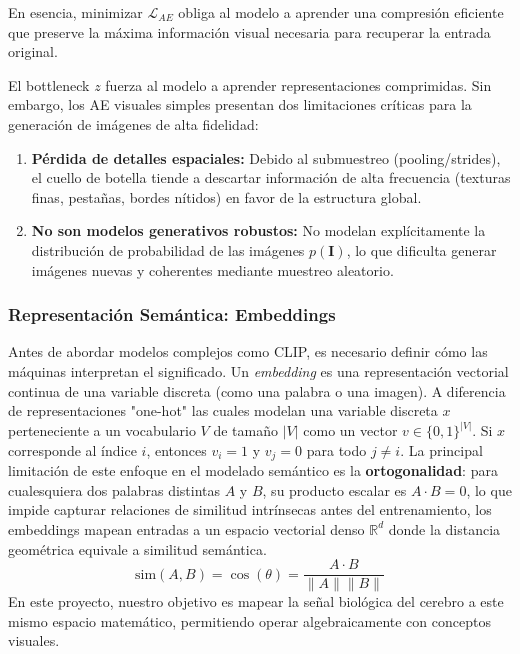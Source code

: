 \documentclass{article}
\begin{document}
En esencia, minimizar $\mathcal{L}_{AE}$ obliga al modelo a aprender una compresión eficiente que preserve la máxima información visual necesaria para recuperar la entrada original.

El bottleneck $z$ fuerza al modelo a aprender representaciones comprimidas. Sin embargo, los AE visuales simples presentan dos limitaciones críticas para la generación de imágenes de alta fidelidad:
\begin{enumerate}
    \item \textbf{Pérdida de detalles espaciales:} Debido al submuestreo (pooling/strides), el cuello de botella tiende a descartar información de alta frecuencia (texturas finas, pestañas, bordes nítidos) en favor de la estructura global.
    \item \textbf{No son modelos generativos robustos:} No modelan explícitamente la distribución de probabilidad de las imágenes $p(\mathbf{I})$, lo que dificulta generar imágenes nuevas y coherentes mediante muestreo aleatorio.
\end{enumerate} 

\subsubsection{Representación Semántica: Embeddings}

Antes de abordar modelos complejos como CLIP, es necesario definir cómo las máquinas interpretan el significado. Un \textit{embedding} es una representación vectorial continua de una variable discreta (como una palabra o una imagen).
A diferencia de representaciones "one-hot" las cuales modelan una variable discreta $x$ perteneciente a un vocabulario $V$ de tamaño $|V|$ como un vector $v \in \{0,1\}^{|V|}$. Si $x$ corresponde al índice $i$, entonces $v_i = 1$ y $v_j = 0$ para todo $j \neq i$.
La principal limitación de este enfoque en el modelado semántico es la \textbf{ortogonalidad}: para cualesquiera dos palabras distintas $A$ y $B$, su producto escalar es $A \cdot B = 0$, lo que impide capturar relaciones de similitud intrínsecas antes del entrenamiento, los embeddings mapean entradas a un espacio vectorial denso $\mathbb{R}^d$ donde la distancia geométrica equivale a similitud semántica.
\begin{equation}
    \text{sim}(A, B) = \cos(\theta) = \frac{A \cdot B}{\|A\| \|B\|}
\end{equation}
En este proyecto, nuestro objetivo es mapear la señal biológica del cerebro a este mismo espacio matemático, permitiendo operar algebraicamente con conceptos visuales.
\end{document}
